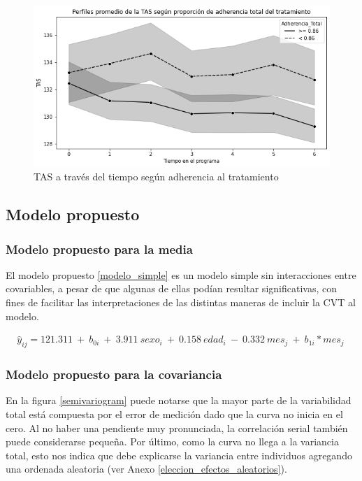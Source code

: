 \documentclass[spanish]{article}
\numberwithin{figure}{subsection}
\numberwithin{equation}{subsection}
\numberwithin{table}{subsection}
\begin{document}
\begin{figure}[H]
	\centering
	\includegraphics[scale=0.5]{img/TAS_vs_tpo_with_adherencia.png}
	\caption{TAS a través del tiempo según adherencia al tratamiento}
	\label{TAS_with_adh}
\end{figure}

\subsection{Modelo propuesto}

\subsubsection{Modelo propuesto para la media}

El modelo propuesto \ref{modelo_simple} es un modelo simple sin interacciones
entre covariables, a pesar de que algunas de ellas podían resultar
significativas, con fines de facilitar las interpretaciones de las distintas
maneras de incluir la CVT al modelo.

\begin{multline}
	\label{modelo_simple}
	\hat{y}_{ij} = 121.311\ +\ b_{0i}\ +\ 3.911\ sexo_i\ +\ 0.158\ edad_i\
	-\ 0.332\ mes_j\ +\ b_{1i}*mes_j\
\end{multline}

\subsubsection{Modelo propuesto para la covariancia}

En la figura \ref{semivariogram} puede notarse que la mayor parte de la
variabilidad total está compuesta por el error de medición dado que la curva no
inicia en el cero. Al no haber una pendiente muy pronunciada, la correlación
serial también puede considerarse pequeña. Por último, como la curva no llega a
la variancia total, esto nos indica que debe explicarse la variancia entre
individuos agregando una ordenada aleatoria (ver Anexo
\ref{eleccion_efectos_aleatorios}).
\end{document}
